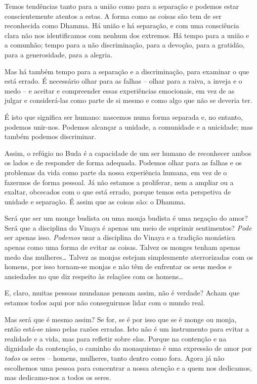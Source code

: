 Temos tendências tanto para a união como para a separação e podemos estar
conscientemente atentos a estas. A forma como as coisas são tem de ser
reconhecida como Dhamma. Há união e há separação, e com uma consciência clara
não nos identificamos com nenhum dos extremos. Há tempo para a união e a
comunhão; tempo para a não discriminação, para a devoção, para a gratidão, para
a generosidade, para a alegria.

Mas há também tempo para a separação e a discriminação, para examinar o que está
errado. É necessário olhar para as falhas -- olhar para a raiva, a inveja e o
medo -- e aceitar e compreender essas experiências emocionais, em vez de as
julgar e considerá-las como parte de si mesmo e como algo que não se deveria
ter.

É isto que significa ser humano: nascemos numa forma separada e, no entanto,
podemos unir-nos. Podemos alcançar a unidade, a comunidade e a unicidade; mas
também podemos discriminar.

Assim, o refúgio no Buda é a capacidade de um ser humano de reconhecer ambos os
lados e de responder de forma adequada. Podemos olhar para as falhas e os
problemas da vida como parte da nossa experiência humana, em vez de o fazermos
de forma pessoal. Já não estamos a proliferar, nem a ampliar ou a exaltar,
obcecados com o que está errado, porque temos esta perspetiva de unidade e
separação. É assim que as coisas são: o Dhamma.

Será que ser um monge budista ou uma monja budista é uma negação do amor? Será
que a disciplina do Vinaya é apenas um meio de suprimir sentimentos? \emph{Pode}
ser apenas isso. \emph{Podemos} usar a disciplina do Vinaya e a tradição
monástica apenas como uma forma de evitar as coisas. Talvez os monges tenham
apenas medo das mulheres\ldots{} Talvez as monjas estejam simplesmente
aterrorizadas com os homens, por isso tornam-se monjas e não têm de enfrentar
os seus medos e ansiedades no que diz respeito às relações com os homens\ldots{}

E, claro, muitas pessoas mundanas pensam assim, não é verdade? Acham que estamos
todos aqui por não conseguirmos lidar com o mundo real.

Mas será que é mesmo assim? Se for, se é por isso que se é monge ou monja, então
está-se nisso pelas razões erradas. Isto não é um instrumento para evitar a
realidade e a vida, mas para refletir sobre elas. Porque na contenção e na
dignidade da contenção, o caminho do monaquismo é uma expressão de amor por
\emph{todos} os seres -- homens, mulheres, tanto dentro como fora. Agora já não
escolhemos uma pessoa para concentrar a nossa atenção e a quem nos dedicamos,
mas dedicamo-nos a todos os seres.

